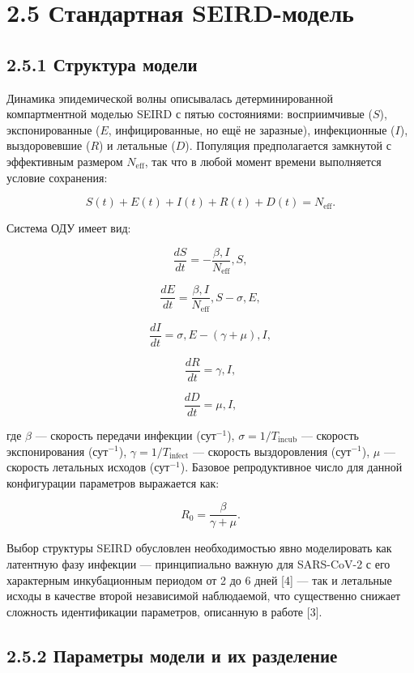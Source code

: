 \documentclass[12pt]{article}
\begin{document}
\section{2.5 Стандартная
SEIRD-модель}\label{ux441ux442ux430ux43dux434ux430ux440ux442ux43dux430ux44f-seird-ux43cux43eux434ux435ux43bux44c}

\subsection{2.5.1 Структура
модели}\label{ux441ux442ux440ux443ux43aux442ux443ux440ux430-ux43cux43eux434ux435ux43bux438}

Динамика эпидемической волны описывалась детерминированной
компартментной моделью SEIRD с пятью состояниями: восприимчивые (\(S\)),
экспонированные (\(E\), инфицированные, но ещё не заразные),
инфекционные (\(I\)), выздоровевшие (\(R\)) и летальные (\(D\)).
Популяция предполагается замкнутой с эффективным размером
\(N_{\text{eff}}\), так что в любой момент времени выполняется условие
сохранения:

\[S(t) + E(t) + I(t) + R(t) + D(t) = N_{\text{eff}}.\]

Система ОДУ имеет вид:

\[\frac{dS}{dt} = -\frac{\beta, I}{N_{\text{eff}}}, S,\]

\[\frac{dE}{dt} = \frac{\beta, I}{N_{\text{eff}}}, S - \sigma, E,\]

\[\frac{dI}{dt} = \sigma, E - (\gamma + \mu), I,\]

\[\frac{dR}{dt} = \gamma, I,\]

\[\frac{dD}{dt} = \mu, I,\]

где \(\beta\) --- скорость передачи инфекции (сут\(^{-1}\)),
\(\sigma = 1/T_{\text{incub}}\) --- скорость экспонирования
(сут\(^{-1}\)), \(\gamma = 1/T_{\text{infect}}\) --- скорость
выздоровления (сут\(^{-1}\)), \(\mu\) --- скорость летальных исходов
(сут\(^{-1}\)). Базовое репродуктивное число для данной конфигурации
параметров выражается как:

\[R_0 = \frac{\beta}{\gamma + \mu}.\]

Выбор структуры SEIRD обусловлен необходимостью явно моделировать как
латентную фазу инфекции --- принципиально важную для SARS-CoV-2 с его
характерным инкубационным периодом от 2 до 6 дней {[}4{]} --- так и
летальные исходы в качестве второй независимой наблюдаемой, что
существенно снижает сложность идентификации параметров, описанную в
работе {[}3{]}.

\subsection{2.5.2 Параметры модели и их
разделение}\label{ux43fux430ux440ux430ux43cux435ux442ux440ux44b-ux43cux43eux434ux435ux43bux438-ux438-ux438ux445-ux440ux430ux437ux434ux435ux43bux435ux43dux438ux435}
\end{document}

